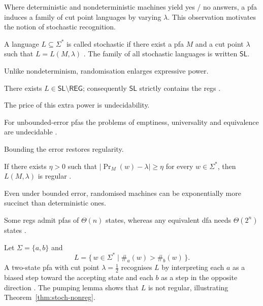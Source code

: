 Where deterministic and nondeterministic machines yield yes / no
answers, a \gls{pfa} induces a family of cut point languages by varying
$\lambda$.  This observation motivates the notion of stochastic
recognition.

\begin{definition}\label{def:stoch}
A language $L\subseteq\Sigma^{\ast}$ is called stochastic if
there exist a \gls{pfa} $M$ and a cut point $\lambda$ such that
$L=L(M,\lambda)$ \cite{rabin1963probabilistic}.  The family of all stochastic
languages is written $\mathsf{SL}$.
\end{definition}

Unlike nondeterminism, randomisation enlarges expressive power.

\begin{theorem}\label{thm:stoch-nonreg}
There exists $L\in\mathsf{SL}\setminus\mathsf{REG}$; consequently
$\mathsf{SL}$ strictly contains the \glspl{reg}
\cite{rabin1963probabilistic}.
\end{theorem}

The price of this extra power is undecidability.

\begin{proposition}\label{prop:pfa-undec}
For unbounded-error \glspl{pfa} the problems of emptiness,
universality and equivalence are undecidable \cite{paz2014introduction}.
\end{proposition}

Bounding the error restores regularity.

\begin{theorem}\label{thm:pfa-bounded}
If there exists $\eta>0$ such that
$\lvert\Pr_{M}(w)-\lambda\rvert\ge\eta$ for every
$w\in\Sigma^{\ast}$, then $L(M,\lambda)$ is regular
\cite{paz2014introduction}.
\end{theorem}

Even under bounded error, randomised machines can be exponentially more
succinct than deterministic ones.

\begin{observation}\label{obs:pfa-states}
Some \glspl{reg} admit \glspl{pfa} of $\Theta(n)$ states, whereas
any equivalent \gls{dfa} needs $\Theta(2^{n})$ states
\cite{paz2014introduction}.
\end{observation}

\begin{example}\label{ex:pfa-majority}
Let $\Sigma=\{a,b\}$ and
\[
  L=\{\,w\in\Sigma^{\ast}\mid\#_{a}(w)>\#_{b}(w)\,\}.
\]
A two-state \gls{pfa} with cut point $\lambda=\tfrac12$ recognises $L$
by interpreting each $a$ as a biased step toward the accepting state and
each $b$ as a step in the opposite direction
\cite{rabin1963probabilistic}.  The pumping lemma shows that $L$ is not regular,
illustrating Theorem~\ref{thm:stoch-nonreg}.
\end{example}

